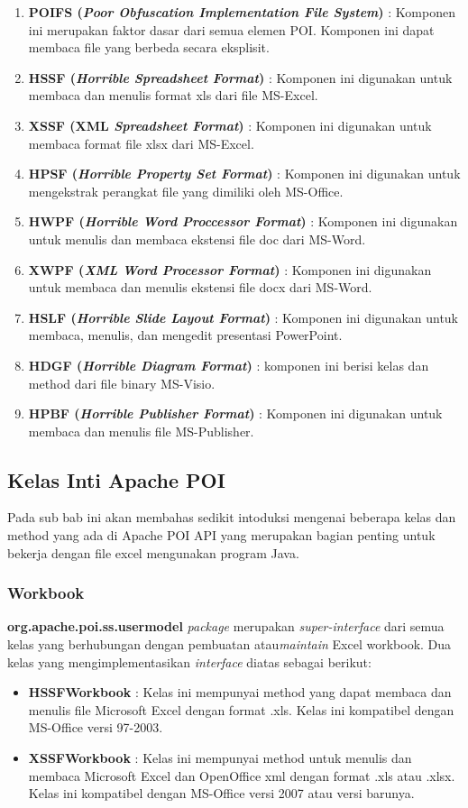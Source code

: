 \begin{enumerate}
	\item \textbf{POIFS (\textit{Poor Obfuscation Implementation File System})} : Komponen ini merupakan faktor dasar dari semua elemen POI. Komponen ini dapat membaca file yang berbeda secara eksplisit.
	\item \textbf{HSSF (\textit{Horrible Spreadsheet Format})} : Komponen ini digunakan untuk membaca dan menulis format xls dari file MS-Excel.
	\item \textbf{XSSF (XML \textit{Spreadsheet Format})} : Komponen ini digunakan untuk membaca format file xlsx dari MS-Excel.
	\item \textbf{HPSF (\textit{Horrible Property Set Format})} : Komponen ini digunakan untuk mengekstrak perangkat file yang dimiliki oleh MS-Office.
	\item \textbf{HWPF (\textit{Horrible Word Proccessor Format})} : Komponen ini digunakan untuk menulis dan membaca ekstensi file doc dari MS-Word.
	\item \textbf{XWPF (\textit{XML Word Processor Format})} : Komponen ini digunakan untuk membaca dan menulis ekstensi file docx dari MS-Word.
	\item \textbf{HSLF (\textit{Horrible Slide Layout Format})} : Komponen ini digunakan untuk membaca, menulis, dan mengedit presentasi PowerPoint.
	\item \textbf{HDGF (\textit{Horrible Diagram Format})} : komponen ini berisi kelas dan method dari file binary MS-Visio.
	\item \textbf{HPBF (\textit{Horrible Publisher Format})} : Komponen ini digunakan untuk membaca dan menulis file MS-Publisher.
\end{enumerate}


\subsection{Kelas Inti Apache POI} 
Pada sub bab ini akan membahas sedikit intoduksi mengenai beberapa kelas dan method yang ada di Apache POI API yang merupakan bagian penting untuk bekerja dengan file excel mengunakan program Java.\cite{tutpoint}

\subsubsection{Workbook}
\textbf{org.apache.poi.ss.usermodel} \textit{package} merupakan \textit{super-interface} dari semua kelas yang berhubungan dengan pembuatan atau\textit{maintain} Excel workbook. Dua kelas yang mengimplementasikan \textit{interface} diatas sebagai berikut:\cite{tutpoint}
\begin{itemize}
	\item \textbf{HSSFWorkbook} : Kelas ini mempunyai method yang dapat membaca dan menulis file Microsoft Excel dengan format .xls. Kelas ini kompatibel dengan MS-Office versi 97-2003.
	\item \textbf{XSSFWorkbook} : Kelas ini mempunyai method untuk menulis dan membaca Microsoft Excel dan OpenOffice xml dengan format .xls atau .xlsx. Kelas ini kompatibel dengan MS-Office versi 2007 atau versi barunya.
\end{itemize}  


